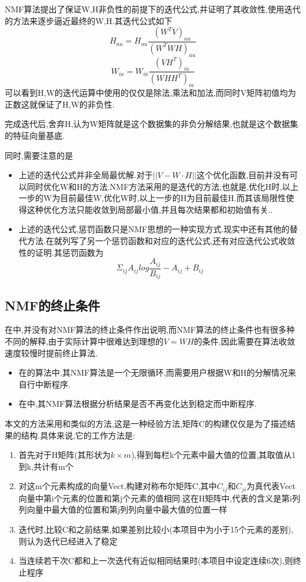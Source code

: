 NMF算法提出了保证W,H非负性的前提下的迭代公式,并证明了其收敛性,使用迭代的方法来逐步逼近最终的W,H.其迭代公式如下
	\begin{equation}
		H_{au} = H_{au}\frac{(W^TV)_{au}}{(W^TWH)_{au}}
	\end{equation}
	\begin{equation}
		W_{ia} = W_{ia}\frac{(VH^T)_{ia}}{(WHH^T)_{ia}}	
	\end{equation}
可以看到H,W的迭代运算中使用的仅仅是除法,乘法和加法,而同时V矩阵初值均为正数这就保证了H,W的非负性.

完成迭代后,舍弃H,认为W矩阵就是这个数据集的非负分解结果,也就是这个数据集的特征向量基底.\newline

同时,需要注意的是
\begin{itemize}
	\item 上述的迭代公式并非全局最优解.对于$||V-W\cdot H||$这个优化函数,目前并没有可以同时优化W和H的方法.NMF方法采用的是迭代的方法,也就是,优化H时,以上一步的W为目前最佳W,优化W时,以上一步的H为目前最佳H.而其该局限性使得这种优化方法只能收敛到局部最小值,并且每次结果都和初始值有关.\cite{berry2007algorithms}.
	\item 上述的迭代公式,惩罚函数只是NMF思想的一种实现方式.现实中还有其他的替代方法.在\cite{lee1999learning, lee2001algorithms}就列写了另一个惩罚函数和对应的迭代公式,还有对应迭代公式收敛性的证明.其惩罚函数为$$\Sigma_{ij}A_{ij} log \frac{A_{ij}}{B_{ij}} - A_{ij} + B_{ij}$$
\end{itemize}

\subsection{NMF的终止条件}
在\cite{lee1999learning, lee2001algorithms}中,并没有对NMF算法的终止条件作出说明,而NMF算法的终止条件也有很多种不同的解释,由于实际计算中很难达到理想的$V=WH$的条件,因此需要在算法收敛速度较慢时提前终止算法.
\begin{itemize}
	\item 在\cite{hoyer2004non}的算法中,其NMF算法是一个无限循环,而需要用户根据W和H的分解情况来自行中断程序.
	\item 在\cite{brunet2004metagenes}中,其NMF算法根据分析结果是否不再变化达到稳定而中断程序.
\end{itemize} 

本文的方法采用和\cite{brunet2004metagenes}类似的方法,这是一种经验方法,矩阵C的构建仅仅是为了描述结果的结构.具体来说,它的工作方法是:
	\begin{enumerate}
		\item 首先对于H矩阵(其形状为$k \times m$),得到每栏k个元素中最大值的位置,其取值从1到k,共计有m个
		\item 对这m个元素构成的向量Vect,构建对称布尔矩阵C,其中$C_{ij}$和$C_{ji}$为真代表Vect向量中第i个元素的位置和第j个元素的值相同.这在H矩阵中,代表的含义是第i列列向量中最大值的位置和第j列列向量中最大值的位置一样
		\item 迭代时,比较C和之前结果,如果差别比较小(本项目中为小于15个元素的差别),则认为迭代已经进入了稳定
		\item 当连续若干次C都和上一次迭代有近似相同结果时(本项目中设定连续6次),则终止程序
	\end{enumerate}

